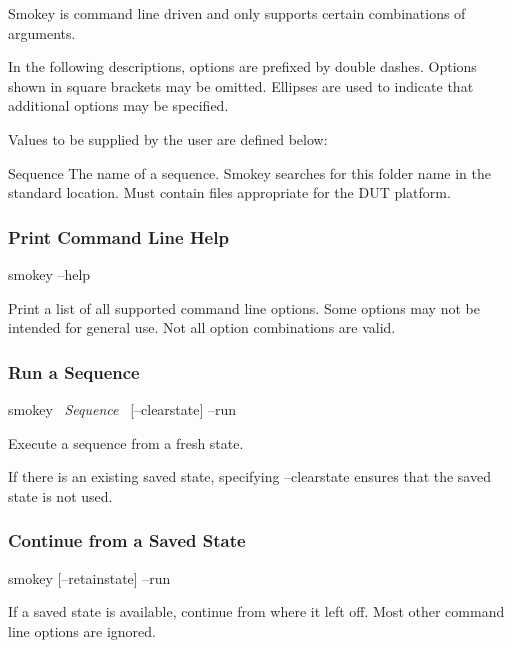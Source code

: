 \documentclass[11pt]{article}
\makeatletter
\newcommand{\iftt}[1]{\ifthenelse{\equal{\f@family}{\ttdefault}}{#1}{}}
\newcommand{\param}[1]{{\iftt{\bfseries}{}\itshape#1}}
\newcommand{\keyword}[1]{\mbox{\ttfamily#1}}
\makeatother
\begin{document}
Smokey is command line driven and only supports certain combinations of
arguments.

In the following descriptions, options are prefixed by double dashes.  Options
shown in square brackets may be omitted.  Ellipses are used to indicate that
additional options may be specified.

Values to be supplied by the user are defined below:

\begin{Definition}

\item[Sequence] The name of a sequence.  Smokey searches for this folder name
	in the standard location.  Must contain files appropriate for the DUT
	platform.

\end{Definition}

\subsubsection{Print Command Line Help}

\begin{CommandLine}
smokey --help
\end{CommandLine}

Print a list of all supported command line options.  Some options may not be
intended for general use.  Not all option combinations are valid.

\subsubsection{Run a Sequence}

\begin{CommandLine}
smokey ~\param{Sequence}~ [--clearstate] --run
\end{CommandLine}

Execute a sequence from a fresh state.

If there is an existing saved state, specifying \keyword{--clearstate} ensures that the
saved state is not used.

\subsubsection{Continue from a Saved State}

\begin{CommandLine}
smokey [--retainstate] --run
\end{CommandLine}

If a saved state is available, continue from where it left off.  Most other
command line options are ignored.
\end{document}
